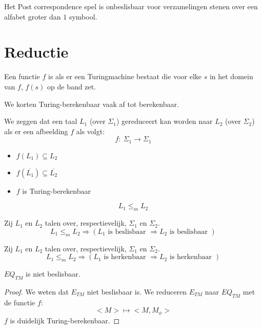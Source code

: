 \documentclass[main.tex]{subfiles}
\begin{document}
\begin{gev}
  Het Post correspondence spel is onbeslisbaar voor verzamelingen stenen over een alfabet groter dan $1$ symbool.
\end{gev}


\section{Reductie}
\label{sec:reductie}

\begin{de}
  Een functie $f$ is  als er een Turingmachine bestaat die voor elke $s$ in het domein van $f$, $f(s)$ op de band zet.
\end{de}

\begin{de}
  We korten Turing-berekenbaar vaak af tot berekenbaar.
\waarom
\end{de}

\begin{de}
  We zeggen dat een taal $L_1$ (over $\Sigma_1$) gereduceert kan worden naar $L_2$ (over $\Sigma_2$) als er een afbeelding $f$ als volgt:
  \[  f:\ \Sigma_1\rightarrow \Sigma_1  \]
  \begin{itemize}
    \item $f(L_1) \subseteq L_2$
    \item $f(\overline{L_1}) \subseteq \overline{L_2}$
    \item $f$ is Turing-berekenbaar
  \end{itemize}
  \[ L_1\le_m L_2 \]
\end{de}

\begin{st}
  Zij $L_1$ en $L_2$ talen over, respectievelijk, $\Sigma_1$ en $\Sigma_2$.
  \[ L_1\le_m L_2 \Rightarrow (L_1 \text{ is beslisbaar } \Rightarrow L_2 \text{ is beslisbaar }) \]
\end{st}


\begin{st}
  Zij $L_1$ en $L_2$ talen over, respectievelijk, $\Sigma_1$ en $\Sigma_2$.
  \[ L_1\le_m L_2 \Rightarrow (L_1 \text{ is herkenbaar } \Rightarrow L_2 \text{ is herkenbaar }) \]
\end{st}


\begin{st}
  $EQ_{TM}$ is niet beslisbaar.

  \begin{proof}
    We weten dat $E_{TM}$ niet beslisbaar is.
    We reduceren $E_{TM}$ naar $EQ_{TM}$ met de functie $f$:
    \[
    <M> \mapsto <M,M_{\phi}>
    \]
    $f$ is duidelijk Turing-berekenbaar.
\waarom
  \end{proof}
\end{st}
\end{document}
